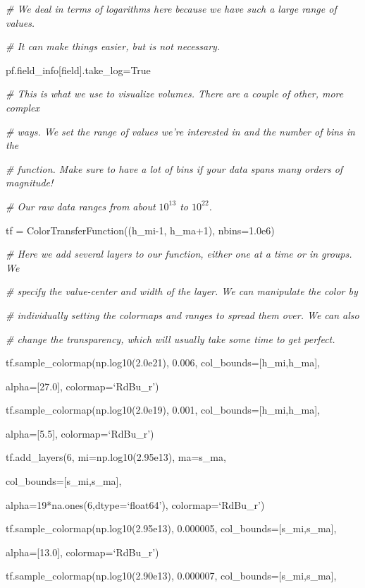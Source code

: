 {\it\# We deal in terms of logarithms here because we have such a large range of values.}
{\setlength{\parskip}{0pt}

{\it\# It can make things easier, but is not necessary.}

pf.field\_info[field].take\_log=True
}

{\it\# This is what we use to visualize volumes. There are a couple of other, more complex}
{\setlength{\parskip}{0pt}

{\it\# ways. We set the range of values we're interested in and the number of bins in the}

{\it\# function. Make sure to have a lot of bins if your data spans many orders of magnitude!}

{\it\# Our raw data ranges from about $10^{13}$ to $10^{22}$.}

tf = ColorTransferFunction((h\_mi-1, h\_ma+1), nbins=1.0e6)
}

{\it\# Here we add several layers to our function, either one at a time or in groups. We}
{\setlength{\parskip}{0pt}

{\it\# specify the value-center and width of the layer. We can manipulate the color by}

{\it\# individually setting the colormaps and ranges to spread them over. We can also}

{\it\# change the transparency, which will usually take some time to get perfect.}

tf.sample\_colormap(np.log10(2.0e21), 0.006, col\_bounds=[h\_mi,h\_ma],
}

{\setlength{\parindent}{96pt}alpha=[27.0], colormap=`RdBu\_r')}

tf.sample\_colormap(np.log10(2.0e19), 0.001, col\_bounds=[h\_mi,h\_ma],

{\setlength{\parindent}{96pt}alpha=[5.5], colormap=`RdBu\_r')}

tf.add\_layers(6, mi=np.log10(2.95e13), ma=s\_ma,

{\setlength{\parindent}{63.5pt}col\_bounds=[s\_mi,s\_ma],}

{\setlength{\parindent}{63.5pt}alpha=19*na.ones(6,dtype=`float64'), colormap=`RdBu\_r')}

tf.sample\_colormap(np.log10(2.95e13), 0.000005, col\_bounds=[s\_mi,s\_ma],

{\setlength{\parindent}{96pt}alpha=[13.0], colormap=`RdBu\_r')}

tf.sample\_colormap(np.log10(2.90e13), 0.000007, col\_bounds=[s\_mi,s\_ma],

